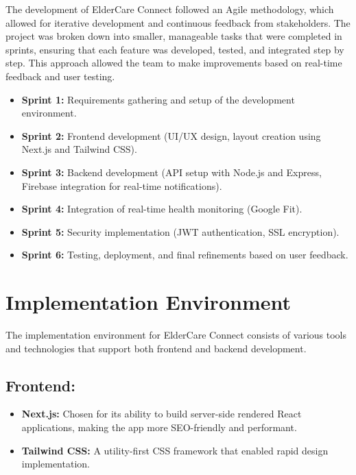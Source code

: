 \documentclass[a4paper, 12pt]{article} %
\begin{document}
The development of ElderCare Connect followed an Agile methodology, which allowed for iterative development and continuous feedback from stakeholders. The project was broken down into smaller, manageable tasks that were completed in sprints, ensuring that each feature was developed, tested, and integrated step by step. This approach allowed the team to make improvements based on real-time feedback and user testing.

\begin{itemize}
    \item \textbf{Sprint 1:} Requirements gathering and setup of the development environment.
    \item \textbf{Sprint 2:} Frontend development (UI/UX design, layout creation using Next.js and Tailwind CSS).
    \item \textbf{Sprint 3:} Backend development (API setup with Node.js and Express, Firebase integration for real-time notifications).
    \item \textbf{Sprint 4:} Integration of real-time health monitoring (Google Fit).
    \item \textbf{Sprint 5:} Security implementation (JWT authentication, SSL encryption).
    \item \textbf{Sprint 6:} Testing, deployment, and final refinements based on user feedback.
\end{itemize}

\section{\textbf{\LARGE Implementation Environment}}

The implementation environment for ElderCare Connect consists of various tools and technologies that support both frontend and backend development.

\subsection*{Frontend:}
\begin{itemize}
    \item \textbf{Next.js:} Chosen for its ability to build server-side rendered React applications, making the app more SEO-friendly and performant.
    \item \textbf{Tailwind CSS:} A utility-first CSS framework that enabled rapid design implementation.
\end{itemize}
\end{document}
